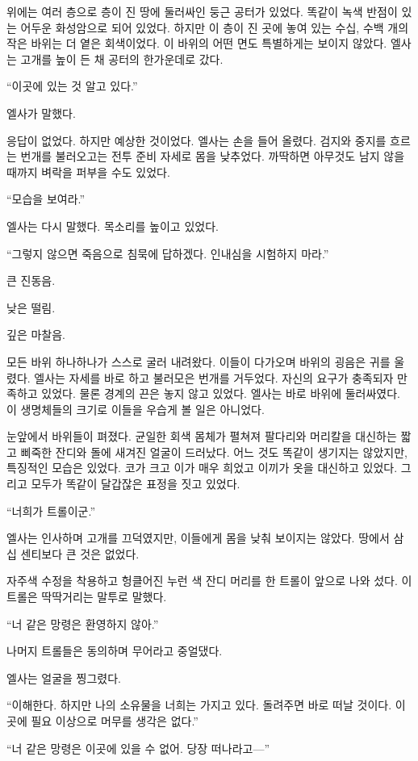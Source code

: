 위에는 여러 층으로 층이 진 땅에 둘러싸인 둥근 공터가 있었다. 똑같이 녹색 반점이 있는 어두운 화성암으로 되어 있었다. 하지만 이 층이 진 곳에 놓여 있는 수십, 수백 개의 작은 바위는 더 옅은 회색이었다. 이 바위의 어떤 면도 특별하게는 보이지 않았다. 엘사는 고개를 높이 든 채 공터의 한가운데로 갔다.

``이곳에 있는 것 알고 있다.''

엘사가 말했다.

응답이 없었다. 하지만 예상한 것이었다. 엘사는 손을 들어 올렸다. 검지와 중지를 흐르는 번개를 불러오고는 전투 준비 자세로 몸을 낮추었다. 까딱하면 아무것도 남지 않을 때까지 벼락을 퍼부을 수도 있었다.

``모습을 보여라.''

엘사는 다시 말했다. 목소리를 높이고 있었다.

``그렇지 않으면 죽음으로 침묵에 답하겠다. 인내심을 시험하지 마라.''

큰 진동음.

낮은 떨림.

깊은 마찰음.

모든 바위 하나하나가 스스로 굴러 내려왔다. 이들이 다가오며 바위의 굉음은 귀를 울렸다. 엘사는 자세를 바로 하고 불러모은 번개를 거두었다. 자신의 요구가 충족되자 만족하고 있었다. 물론 경계의 끈은 놓지 않고 있었다. 엘사는 바로 바위에 둘러싸였다. 이 생명체들의 크기로 이들을 우습게 볼 일은 아니었다.

눈앞에서 바위들이 펴졌다. 균일한 회색 몸체가 펼쳐져 팔다리와 머리칼을 대신하는 짧고 삐죽한 잔디와 돌에 새겨진 얼굴이 드러났다. 어느 것도 똑같이 생기지는 않았지만, 특징적인 모습은 있었다. 코가 크고 이가 매우 희었고 이끼가 옷을 대신하고 있었다. 그리고 모두가 똑같이 달갑잖은 표정을 짓고 있었다.

``너희가 트롤이군.''

엘사는 인사하며 고개를 끄덕였지만, 이들에게 몸을 낮춰 보이지는 않았다. 땅에서 삼십 센티보다 큰 것은 없었다.

자주색 수정을 착용하고 헝클어진 누런 색 잔디 머리를 한 트롤이 앞으로 나와 섰다. 이 트롤은 딱딱거리는 말투로 말했다.

``너 같은 망령은 환영하지 않아.''

나머지 트롤들은 동의하며 무어라고 중얼댔다.

엘사는 얼굴을 찡그렸다.

``이해한다. 하지만 나의 소유물을 너희는 가지고 있다. 돌려주면 바로 떠날 것이다. 이곳에 필요 이상으로 머무를 생각은 없다.''

``너 같은 망령은 이곳에 있을 수 없어. 당장 떠나라고—''

